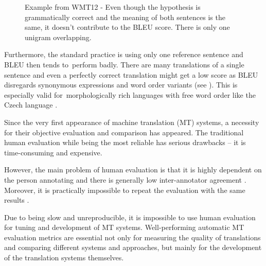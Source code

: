 {\begin{figure*}[h]
\begin{center}
\begin{tabular}{ll}
\end{tabular}
\caption{Example from WMT12 \citep{wmt12} - Even though the hypothesis is grammatically
correct and the meaning of both sentences is the same, it doesn't 
contribute to the BLEU score. There is only one unigram overlapping.}
\end{center}
\label{example_of_BLEU_malfunction}
\end{figure*}



Furthermore, the standard practice is using only one reference sentence and 
BLEU  then tends to~perform badly. There are many translations of a single 
sentence and even a perfectly correct translation might get a low score 
as BLEU disregards synonymous expressions and word order variants (see ). This is especially valid 
for~morphologically rich languages with free word order like the Czech 
language \cite{bojar-tackling-sparse-data}.











Since the very first appearance of machine translation (MT) systems, a 
necessity for their objective evaluation and comparison has appeared. The 
traditional human evaluation while being the most reliable has serious 
drawbacks -- it is time-consuming and expensive.

However, the main problem of human evaluation is that it is highly dependent on 
the person annotating and there is generally low inter-annotator agreement 
\cite{wmt13}. Moreover, it is practically impossible to repeat the evaluation 
with the same results \cite{bojar-kniha}. 

Due to being slow and unreproducible, it is impossible to use human evaluation
for tuning and development of MT systems. Well-performing automatic MT 
evaluation metrics are essential not only for measuring the quality of translations 
and comparing different systems and approaches, but mainly for the development 
of the translation systems themselves. 



}
